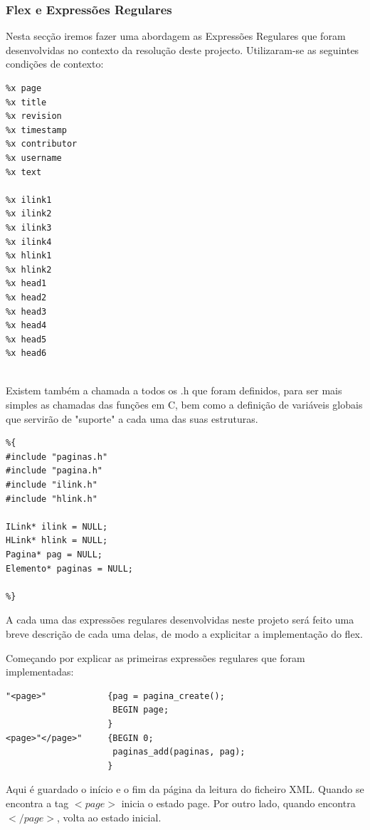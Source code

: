 \documentclass[11pt, a4paper, oneside]{article}
\begin{document}
\subsubsection{Flex e Expressões Regulares}

Nesta secção iremos fazer uma abordagem as Expressões Regulares que foram desenvolvidas no contexto da resolução deste projecto. Utilizaram-se as seguintes condições de contexto:

\begin{verbatim}
%x page
%x title
%x revision
%x timestamp
%x contributor
%x username
%x text

%x ilink1
%x ilink2
%x ilink3
%x ilink4
%x hlink1
%x hlink2
%x head1
%x head2
%x head3
%x head4
%x head5
%x head6


\end{verbatim}


Existem também a chamada a todos os .h que foram definidos, para ser mais simples as chamadas das funções em C, bem como a definição de variáveis globais que servirão de "suporte" a cada uma das suas estruturas.

\begin{verbatim}
%{
#include "paginas.h"
#include "pagina.h"
#include "ilink.h"
#include "hlink.h"

ILink* ilink = NULL;
HLink* hlink = NULL;
Pagina* pag = NULL;
Elemento* paginas = NULL;

%}

\end{verbatim}
A cada uma das expressões regulares desenvolvidas neste projeto será feito uma breve descrição de cada uma delas, de modo a explicitar a implementação do flex.

Começando por explicar as primeiras expressões regulares que foram implementadas: 


\begin{verbatim}
"<page>"            {pag = pagina_create();
                     BEGIN page;
                    }
<page>"</page>"     {BEGIN 0;
                     paginas_add(paginas, pag);
                    }
\end{verbatim}

Aqui é guardado o início e o fim da página da leitura do ficheiro XML. Quando se encontra a tag \begin{math}<page>\end{math} inicia o estado page. Por outro lado, quando encontra \begin{math}</page>\end{math}, volta ao estado inicial. 
\end{document}
